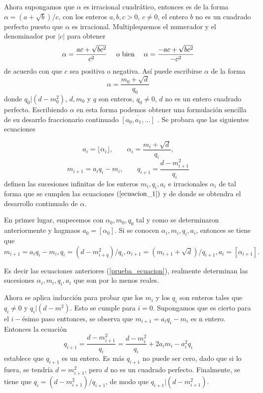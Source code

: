 \documentclass[11pt, article]{article}
\begin{document}
    Ahora supongamos que $\alpha$ es irracional cuadrático, entonces es de la forma $\alpha=(a+\sqrt{b})/c$, con los enteros $a,b,c>0$, $c\not=0$, el entero $b$ no es un cuadrado perfecto puesto que $\alpha$ es irracional. Multiplequemos el numerador y el denominador por $|c|$ para obtener 
        \[
        \alpha = \dfrac{ac + \sqrt{bc^2}}{c^2} \quad \textnormal{ o bien } \quad \alpha=\dfrac{-ac+\sqrt{bc^2}}{-c^2}
        \]
    de acuerdo con que $c$ sea positiva o negativa. Así puede escribirse $\alpha$ de la forma
        \[
        \alpha = \dfrac{m_0+\sqrt{d}}{q_0}
        \]
    donde $q_0|(d-m_0^2)$, $d,m_0$ y $q$ son enteros, $q_0\not=0$, $d$ no es un entero cuadrado perfecto. Escribiendo $\alpha$ en esta forma podemos obtener una formulación sencilla de su desarrlo fraccionario continuado $\overline{[a_0,a_1,...]}$ . Se probara que las siguientes ecuaciones 

        \begin{equation}
        a_i= \lfloor \alpha_i \rfloor, \qquad \alpha_i=\dfrac{m_i+\sqrt{d}}{q_i}, \label{prueba_ecuacion}
        \end{equation}
        \[
        m_{i+1}=a_iq_i-m_i, \qquad q_{i+1}=\dfrac{d-m_{i+1}^2}{q_i}
        \] 
    definen las sucesiones infinitas de los enteros $m_i,q_i,a_i$ e irracionales $\alpha_i$ de tal forma que se cumplen las ecuaciones $(\ref{ecuacion_1})$ y de donde se obtendra el desarrollo continuado de $\alpha$.

    En primer lugar, empecemos con $\alpha_0,m_0,q_0$ tal y como se determinaron anteriormente  y hagmaos $a_0=[\alpha_0]$. Si se conocen $\alpha_i,m_i,q_i,a_i$, entonces se tiene que 
        \[
         m_{i+1}=a_iq_i - m_i, q_i=(d-m_{i+q}^2)/q_i, \alpha_{i+1}=(m_{i+1} + \sqrt{d})/q_{i+1}, a_i=[\alpha_{i+1}].
         \]
    
    Es decir las ecuaciones anteriores (\ref{prueba_ecuacion}), realmente determinan las sucesiones $\alpha_i,m_i,q_i,a_i$ que son por lo menos reales.
    
    Ahora se aplica inducción para probar que los $m_i$ y los $q_i$ son enteros tales que $q_i\not=0$ y $q_i|(d-m^2)$. Esto se cumple para $i=0$. Supongamos que es cierto para el $i-$ésimo paso enttonces, se observa que $m_{i+1}=a_iq_i-m_i$ es n entero. Entonces la ecuación 
         \[
        q_{i+1}=\dfrac{d-m_{i+1}^2}{q_i}=\dfrac{d-m_i^2}{q_i} + 2a_im_i-a_i^2q_i
        \]
    establece que $q_{i+1}$ es un entero. Es más $q_{i+1}$ no puede ser cero, dado que si lo fuera, se tendría $d=m^2_{i+1}$, pero $d$ no es un cuadrado perfecto. Finalmente, se tiene que $q_i=(d-m_{i+1}^2)/q_{i+1}$, de modo que $q_{i+1}|(d-m_{i+1}^2)$.
    
\end{document}
